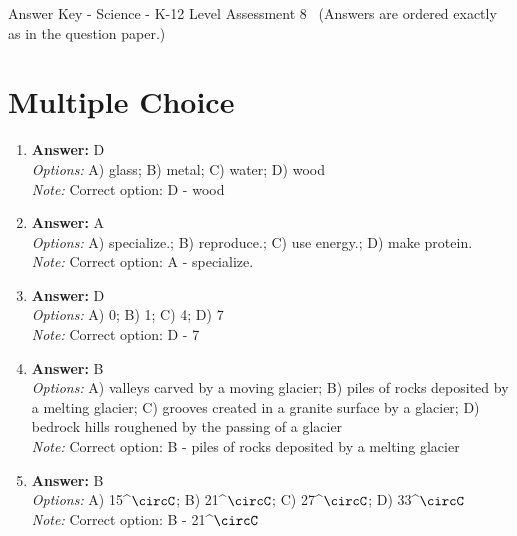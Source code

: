 \documentclass[12pt]{article}
\begin{document}
\begin{center}
Answer Key - Science - K-12 Level Assessment 8 \
\small (Answers are ordered exactly as in the question paper.)
\end{center}

\section*{Multiple Choice}
\begin{enumerate}[label=\arabic*.]
\item \textbf{Answer:} D
\\ \textit{Options:} A) glass; B) metal; C) water; D) wood
\\ \textit{Note:} Correct option: D - wood
\item \textbf{Answer:} A
\\ \textit{Options:} A) specialize.; B) reproduce.; C) use energy.; D) make protein.
\\ \textit{Note:} Correct option: A - specialize.
\item \textbf{Answer:} D
\\ \textit{Options:} A) 0; B) 1; C) 4; D) 7
\\ \textit{Note:} Correct option: D - 7
\item \textbf{Answer:} B
\\ \textit{Options:} A) valleys carved by a moving glacier; B) piles of rocks deposited by a melting glacier; C) grooves created in a granite surface by a glacier; D) bedrock hills roughened by the passing of a glacier
\\ \textit{Note:} Correct option: B - piles of rocks deposited by a melting glacier
\item \textbf{Answer:} B
\\ \textit{Options:} A) 15^\ensuremath{\circC}; B) 21^\ensuremath{\circC}; C) 27^\ensuremath{\circC}; D) 33^\ensuremath{\circC}
\\ \textit{Note:} Correct option: B - 21^\ensuremath{\circC}
\end{enumerate}
\end{document}
